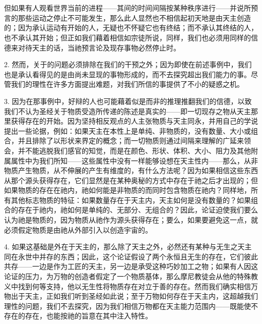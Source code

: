 
\section{}

但如果有人观看世界当前的进程——其间的时间间隔按某种秩序进行——并说所预言的那些运动之停止不可能发生，那么此人显然也不相信起初天地是由天主创造的；因为承认运动有开始的人，无疑也不怀疑它也有终结；而不承认其终结的人，也不承认其开始；但正如我们藉着相信如宗徒所说，同样，我们也必须用同样的信德来对待天主的话，当祂预言论及现存事物必然停止时。\par

2. 然而，关于的问题必须排除在我们的干预之外；因为即使在前述事例中，我们也是承认看得见的是由尚未显现的事物形成的，而不去探究超出我们能力的事。尽管我们的理性在许多方面提出难题，对我们所信的事提供了不小的疑惑之机。\par

3. 因为在那事例中，好辩的人也可能藉着似是而非的推理推翻我们的信德，以致我们不认为圣经关于物质受造所传递的陈述是真实的——即一切现存之物从天主那里获得存在的开始。因为坚持相反观点的人主张物质与天主同永，并用自己的学说提出一些论据，例如：如果天主在本性上是单纯、非物质的，没有数量、大小或组合，并且排除了以形状来界定的概念；而一切物质则通过间隔来理解的广延来领会，并不能逃脱我们感官的知觉，而是在颜色、形状、体积、大小、阻力及其他附属属性中为我们所知——这些属性中没有一样能够设想在天主性内——那么，从非物质产生物质，从不伸展的产生有维度的，有什么方法呢？因为如果相信这些东西从那个源头获得存在，它们显然是在某种奥秘的方式中存在于祂之后才出现的；但如果物质的存在在祂内，祂如何能是非物质的而同时包含物质在祂内？同样地，所有其他标志物质的特征：如果数量存在于天主内，天主如何是没有数量的？如果组合的存在于祂内，祂如何是单纯的、无部分、无组合的？因此，论证迫使我们要么认为祂是物质的，因为物质从祂作为源头获得存在；要么，如果要避免这一点，就必须假定物质是由祂从外部引入以创造宇宙的。\par

4. 如果这基础是外在于天主的，那么除了天主之外，必然还有某种与无生之天主同在永世中并存的东西；因此，这个论证假设了两个永恒且无生的存在，它们彼此共存——一边是作为工匠的天主，另一边是承受这种巧妙加工之物；如果有人因这论证的压力，为万物的创造者假定了一个物质基体，那么摩尼教徒会从他的特殊教义中找到何等支持，他以无生性将物质存在对立于善的存在。然而我们确实相信万物出于天主，正如我们听到圣经如此说；至于万物如何存在于天主内，这超越我们理性的问题，我们不去探究，因为我们相信万物都在天主能力范围内——既能使不存在的存在，也能按祂的旨意在其中注入特性。\par

